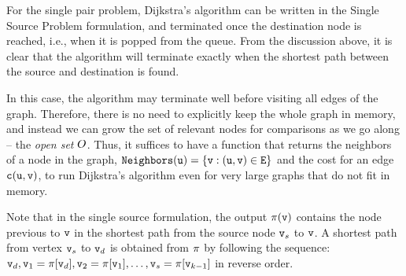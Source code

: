For the single pair problem, Dijkstra's algorithm can be written in the Single Source Problem formulation, and terminated once the destination node is reached, i.e., when it is popped from the queue. From the discussion above, it is clear that the algorithm will terminate exactly when the shortest path between the source and destination is found.

In this case, the algorithm may terminate well before visiting all edges of the graph. Therefore, there is no need to explicitly keep the whole graph in memory, and instead we can grow the set of relevant nodes for comparisons as we go along -- the \textit{open set} ${O}$. Thus, it suffices to have a function that returns the neighbors of a node in the graph, $\texttt{Neighbors}({\tt u}) = \left\{{\tt v} :  ({\tt u}, {\tt v}) \in {\tt E}\right\}$ and the cost for an edge ${\tt c}({\tt u}, {\tt v})$, to run Dijkstra's algorithm even for very large graphs that do not fit in memory.

Note that in the single source formulation, the output $\pi({\tt v})$ contains the node previous to ${\tt v}$ in the shortest path from the source node ${\tt v}_s$ to ${\tt v}$. A shortest path from vertex ${\tt v}_s$ to ${\tt v}_d$ is obtained from $\pi $ by following the sequence: ${\tt v}_d, {{\tt v}_1} = \pi [{\tt v}_d], {{\tt v}_2} = \pi [{{\tt v}_1}],  \ldots ,{\tt v}_s = \pi [{{\tt v}_{k - 1}}]$ in reverse order.

